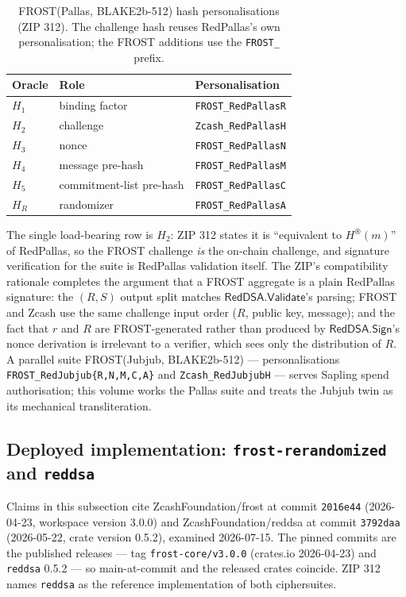 \documentclass[11pt,a4paper]{article}
\theoremstyle{definition}
\begin{document}
\begin{table}[htbp]
\centering
\small
\begin{tabular}{@{}lll@{}}
\toprule
Oracle & Role & Personalisation \\
\midrule
$H_1$ & binding factor        & \texttt{FROST\_RedPallasR} \\
$H_2$ & challenge             & \texttt{Zcash\_RedPallasH} \\
$H_3$ & nonce                 & \texttt{FROST\_RedPallasN} \\
$H_4$ & message pre-hash      & \texttt{FROST\_RedPallasM} \\
$H_5$ & commitment-list pre-hash & \texttt{FROST\_RedPallasC} \\
$H_R$ & randomizer            & \texttt{FROST\_RedPallasA} \\
\bottomrule
\end{tabular}
\caption{FROST(Pallas, BLAKE2b-512) hash personalisations (ZIP 312).
The challenge hash reuses RedPallas's own personalisation; the FROST
additions use the \texttt{FROST\_} prefix.}
\label{tab:fr-pallas-suite}
\end{table}

The single load-bearing row is $H_2$: ZIP 312 states it is
``equivalent to $H^{\circledast}(m)$'' of RedPallas, so the FROST
challenge \emph{is} the on-chain challenge, and signature verification
for the suite is RedPallas validation itself. The ZIP's compatibility
rationale completes the argument that a FROST aggregate is a plain
RedPallas signature: the $(R, S)$ output split matches
$\mathsf{RedDSA.Validate}$'s parsing; FROST and Zcash use the same
challenge input order ($R$, public key, message); and the fact that $r$
and $R$ are FROST-generated rather than produced by
$\mathsf{RedDSA.Sign}$'s nonce derivation is irrelevant to a verifier,
which sees only the distribution of $R$. A parallel suite
FROST(Jubjub, BLAKE2b-512) --- personalisations
\texttt{FROST\_RedJubjub\{R,N,M,C,A\}} and \texttt{Zcash\_RedJubjubH}
--- serves Sapling spend authorisation; this volume works the Pallas
suite and treats the Jubjub twin as its mechanical transliteration.

\subsection{Deployed implementation: \texttt{frost-rerandomized} and
\texttt{reddsa}}\label{sec:fr-rerand-impl}

Claims in this subsection cite ZcashFoundation/frost at commit
\texttt{2016e44} (2026-04-23, workspace version 3.0.0) and
ZcashFoundation/reddsa at commit \texttt{3792daa} (2026-05-22, crate
version 0.5.2), examined 2026-07-15. The pinned commits are the
published releases --- tag \texttt{frost-core/v3.0.0} (crates.io
2026-04-23) and \texttt{reddsa} 0.5.2 --- so main-at-commit and the
released crates coincide. ZIP 312 names \texttt{reddsa} as the
reference implementation of both ciphersuites.
\end{document}
